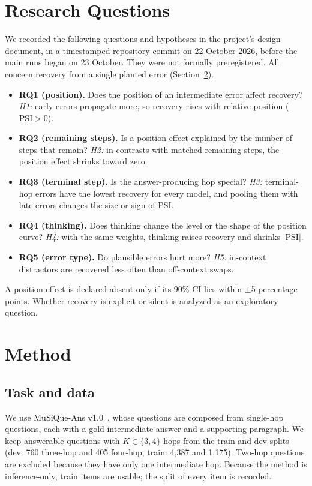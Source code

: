 \documentclass[conference]{IEEEtran}
\newcommand{\PSI}{\mathrm{PSI}}
\begin{document}
\section{Research Questions}
We recorded the following questions and hypotheses in the project's design document, in a timestamped repository commit on 22 October 2026, before the main runs began on 23 October. They were not formally preregistered. All concern recovery from a single planted error (Section~\ref{sec:method}).
\begin{itemize}
\item \textbf{RQ1 (position).} Does the position of an intermediate error affect recovery? \emph{H1:} early errors propagate more, so recovery rises with relative position ($\PSI>0$).
\item \textbf{RQ2 (remaining steps).} Is a position effect explained by the number of steps that remain? \emph{H2:} in contrasts with matched remaining steps, the position effect shrinks toward zero.
\item \textbf{RQ3 (terminal step).} Is the answer-producing hop special? \emph{H3:} terminal-hop errors have the lowest recovery for every model, and pooling them with late errors changes the size or sign of $\PSI$.
\item \textbf{RQ4 (thinking).} Does thinking change the level or the shape of the position curve? \emph{H4:} with the same weights, thinking raises recovery and shrinks $|\PSI|$.
\item \textbf{RQ5 (error type).} Do plausible errors hurt more? \emph{H5:} in-context distractors are recovered less often than off-context swaps.
\end{itemize}
A position effect is declared absent only if its 90\% CI lies within $\pm$5 percentage points. Whether recovery is explicit or silent is analyzed as an exploratory question.

\section{Method}
\label{sec:method}

\subsection{Task and data}
We use MuSiQue-Ans v1.0~\cite{musique}, whose questions are composed from single-hop questions, each with a gold intermediate answer and a supporting paragraph. We keep answerable questions with $K\in\{3,4\}$ hops from the train and dev splits (dev: 760 three-hop and 405 four-hop; train: 4{,}387 and 1{,}175). Two-hop questions are excluded because they have only one intermediate hop. Because the method is inference-only, train items are usable; the split of every item is recorded.
\end{document}
